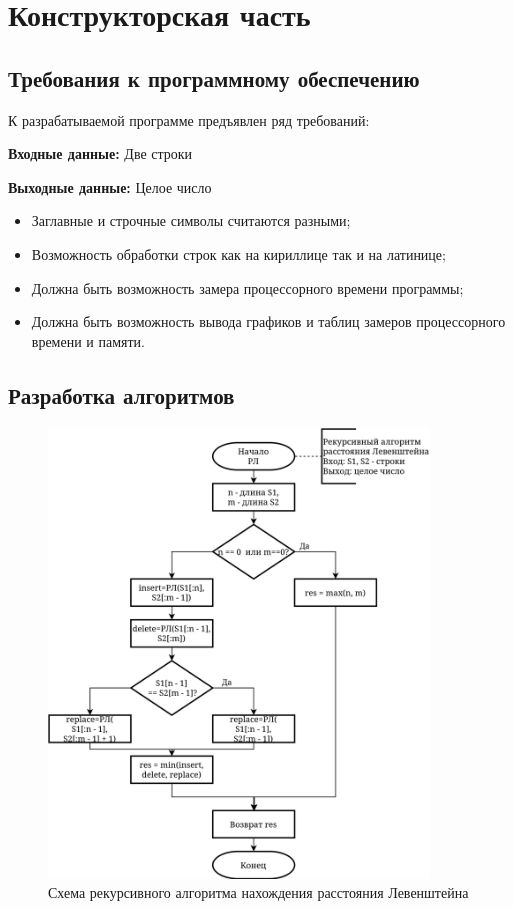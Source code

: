 \chapter{Конструкторская часть}

\section{Требования к программному обеспечению}

К разрабатываемой программе предъявлен ряд требований:

\textbf{Входные данные:} Две строки

\textbf{Выходные данные:} Целое число

\begin{itemize}
	\item Заглавные и строчные символы считаются разными;
	\item Возможность обработки строк как на кириллице так и на латинице;
	\item Должна быть возможность замера процессорного времени программы;
	\item Должна быть возможность вывода графиков и таблиц замеров процессорного времени и памяти.
\end{itemize}

\section{Разработка алгоритмов}

\begin{figure}
	\centering
	\includegraphics[width=0.9\textwidth]{RL}
	\caption{Схема рекурсивного алгоритма нахождения расстояния Левенштейна}
	\label{fig:RL}
\end{figure}

